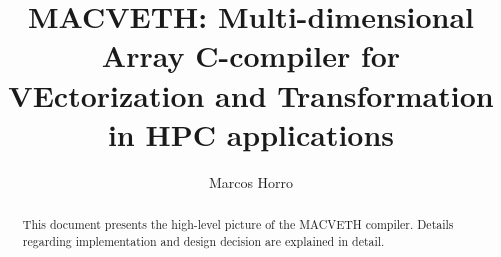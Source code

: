 \documentclass[a4paper,12pt]{memoir}
\title{MACVETH: Multi-dimensional Array C-compiler for VEctorization and Transformation in HPC applications}
\author{Marcos Horro}
\date{}
\begin{document}
\maketitle

\begin{abstract}
	This document presents the high-level picture of the MACVETH compiler. Details regarding implementation and design decision are explained in detail.
\end{abstract}
\end{document}

